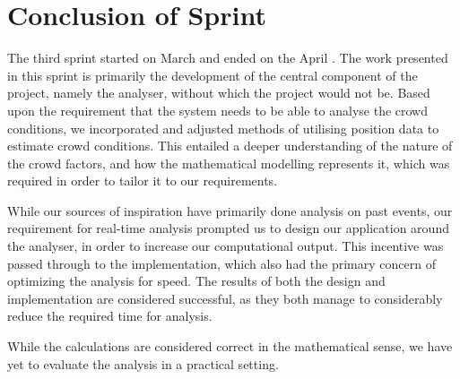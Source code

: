 \section{Conclusion of Sprint}
The third sprint started on March  and ended on the April . The work presented in this sprint is primarily the development of the central component of the project, namely the analyser, without which the project would not be. Based upon the requirement that the system needs to be able to analyse the crowd conditions, we incorporated and adjusted methods of utilising position data to estimate crowd conditions. This entailed a deeper understanding of the nature of the crowd factors, and how the mathematical modelling represents it, which was required in order to tailor it to our requirements.

While our sources of inspiration have primarily done analysis on past events, our requirement for real-time analysis prompted us to design our application around the analyser, in order to increase our computational output. This incentive was passed through to the implementation, which also had the primary concern of optimizing the analysis for speed. The results of both the design and implementation are considered successful, as they both manage to considerably reduce the required time for analysis.

While the calculations are considered correct in the mathematical sense, we have yet to evaluate the analysis in a practical setting.
